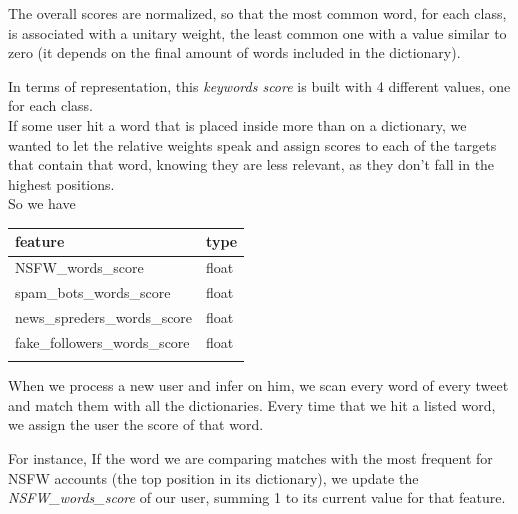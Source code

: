 The overall scores are normalized, so that the most common word, for each class, is associated with a unitary weight, the least common one with a value similar to zero (it depends on the final amount of words included in the dictionary).

In terms of representation, this \textit{keywords score} is built with 4 different values, one for each class.\\

If some user hit a word that is placed inside more than on a dictionary, we wanted to let the relative weights speak and assign scores to each of the targets that contain that word, knowing they are less relevant, as they don't fall in the highest positions.\\
So we have

\small
\begin{center}
	\begin{tabular}{ll}
		\\feature&type\\
		\hline\hline
		NSFW\_words\_score&float\\
		spam\_bots\_words\_score&float\\
		news\_spreders\_words\_score&float\\
		fake\_followers\_words\_score&float\\\hline\\
	\end{tabular}
\end{center}
\normalsize
When we process a new user and infer on him, we scan every word of every tweet and match them with all the dictionaries. Every time that we hit a listed word, we assign the user the score of that word.

For instance, If the word we are comparing matches with the most frequent for NSFW accounts (the top position in its dictionary), we update the \textit{NSFW\_words\_score} of our user, summing 1 to its current value for that feature.

